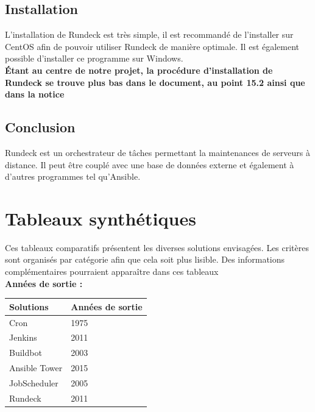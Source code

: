 \documentclass[12pt]{article}
\begin{document}
\subsection{Installation}
L'installation de Rundeck est très simple, il est recommandé de l'installer sur CentOS afin de pouvoir utiliser Rundeck de manière optimale. Il est également possible d'installer ce programme sur Windows. 
\\
\textbf{Étant au centre de notre projet, la procédure d'installation de Rundeck se trouve plus bas dans le document, au point 15.2 ainsi que dans la notice}

\subsection{Conclusion}
Rundeck est un orchestrateur de tâches permettant la maintenances de serveurs à distance. Il peut être couplé avec une base de données externe et également à d'autres programmes tel qu'Ansible.

\newpage
\section{Tableaux synthétiques}
Ces tableaux comparatifs présentent les diverses solutions envisagées. Les critères sont organisés par catégorie afin que cela soit plus lisible. Des informations complémentaires pourraient apparaître dans ces tableaux
\vspace{0.5cm}
\\
\textbf{Années de sortie :}

\vspace{0.5cm}

\begin{center}
\begin{tabular}{|l|l|}
\hline
Solutions     & Années de sortie \\ \hline
Cron          & 1975             \\ \hline
Jenkins       & 2011             \\ \hline
Buildbot      & 2003             \\ \hline
Ansible Tower & 2015             \\ \hline
JobScheduler  & 2005             \\ \hline
Rundeck       & 2011             \\ \hline
\end{tabular}
\end{center}

\vspace{0.5cm}
\end{document}
